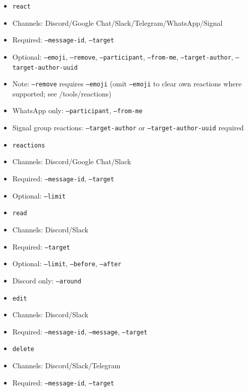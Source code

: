 \begin{itemize}
  \item \texttt{react}
  \item Channels: Discord/Google Chat/Slack/Telegram/WhatsApp/Signal
  \item Required: \texttt{--message-id}, \texttt{--target}
  \item Optional: \texttt{--emoji}, \texttt{--remove}, \texttt{--participant}, \texttt{--from-me}, \texttt{--target-author}, \texttt{--target-author-uuid}
  \item Note: \texttt{--remove} requires \texttt{--emoji} (omit \texttt{--emoji} to clear own reactions where supported; see /tools/reactions)
  \item WhatsApp only: \texttt{--participant}, \texttt{--from-me}
  \item Signal group reactions: \texttt{--target-author} or \texttt{--target-author-uuid} required
\end{itemize}


\begin{itemize}
  \item \texttt{reactions}
  \item Channels: Discord/Google Chat/Slack
  \item Required: \texttt{--message-id}, \texttt{--target}
  \item Optional: \texttt{--limit}
\end{itemize}


\begin{itemize}
  \item \texttt{read}
  \item Channels: Discord/Slack
  \item Required: \texttt{--target}
  \item Optional: \texttt{--limit}, \texttt{--before}, \texttt{--after}
  \item Discord only: \texttt{--around}
\end{itemize}


\begin{itemize}
  \item \texttt{edit}
  \item Channels: Discord/Slack
  \item Required: \texttt{--message-id}, \texttt{--message}, \texttt{--target}
\end{itemize}


\begin{itemize}
  \item \texttt{delete}
  \item Channels: Discord/Slack/Telegram
  \item Required: \texttt{--message-id}, \texttt{--target}
\end{itemize}


